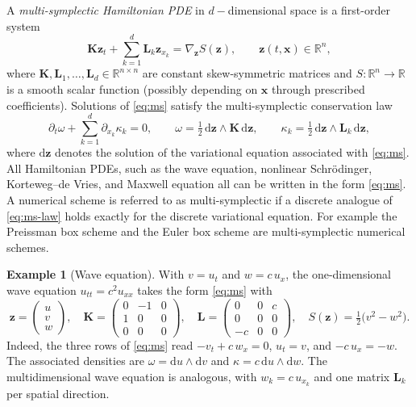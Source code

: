 \documentclass[11pt]{article}
\theoremstyle{definition}
\newtheorem{example}[theorem]{Example}
\theoremstyle{remark}
\newcommand{\R}{\mathbb{R}}
\newcommand{\dd}{\mathrm{d}}
\newcommand{\bz}{\bm{z}}
\newcommand{\bx}{\bm{x}}
\newcommand{\bK}{\bm{K}}
\newcommand{\bL}{\bm{L}}
\begin{document}
A \emph{multi-symplectic Hamiltonian PDE}
\cite{bridges1997multi,bridges2001multi} in $d-$dimensional space is a
first-order system
\begin{equation}
\label{eq:ms}
\bK \bz_t + \sum_{k=1}^{d}\bL_k \bz_{x_k} = \nabla_{\bz} S(\bz),
\qquad \bz(t,\bx)\in\R^n,
\end{equation}
where $\bK,\bL_1,\dots,\bL_d\in\R^{n\times n}$ are constant
skew-symmetric matrices and $S:\R^n\to\R$ is a smooth scalar function
(possibly depending on $\bx$ through prescribed coefficients).
Solutions of \eqref{eq:ms} satisfy the multi-symplectic
conservation law
\begin{equation}
\label{eq:ms-law}
\partial_t\omega + \sum_{k=1}^{d}\partial_{x_k}\kappa_k = 0,
\qquad
\omega = \tfrac12\,\dd\bz\wedge\bK\,\dd\bz,
\qquad
\kappa_k = \tfrac12\,\dd\bz\wedge\bL_k\,\dd\bz,
\end{equation}
where $\dd\bz$ denotes the solution of the variational equation
associated with \eqref{eq:ms}.  All Hamiltonian PDEs, such as the wave equation, nonlinear Schr\"odinger, Korteweg--de Vries, and Maxwell equation all can be written in the form \eqref{eq:ms}. A numerical scheme is referred to as multi-symplectic if a discrete analogue of \eqref{eq:ms-law} holds exactly for the discrete variational equation. For example the Preissman box scheme and the Euler box scheme
\cite{bridges2001multi,moore2003backward} are multi-symplectic numerical schemes.

\begin{example}[Wave equation]
\label{ex:wave-ms}
With $v=u_t$ and $w=c\,u_x$, the one-dimensional wave equation
$u_{tt}=c^2u_{xx}$ takes the form \eqref{eq:ms} with
\begin{equation}
\label{eq:wave-ms-matrices}
\bz=\begin{pmatrix}u\\ v\\ w\end{pmatrix},
\quad
\bK=\begin{pmatrix}0&-1&0\\ 1&0&0\\ 0&0&0\end{pmatrix},
\quad
\bL=\begin{pmatrix}0&0&c\\ 0&0&0\\ -c&0&0\end{pmatrix},
\quad
S(\bz)=\tfrac12\bigl(v^2-w^2\bigr).
\end{equation}
Indeed, the three rows of \eqref{eq:ms} read
$-v_t+c\,w_x = 0$, $u_t = v$, and $-c\,u_x=-w$.  The associated
densities are $\omega=\dd u\wedge\dd v$ and
$\kappa=c\,\dd u\wedge\dd w$.  The multidimensional wave equation is
analogous, with $w_k=c\,u_{x_k}$ and one matrix $\bL_k$ per spatial
direction.
\end{example}
\end{document}
